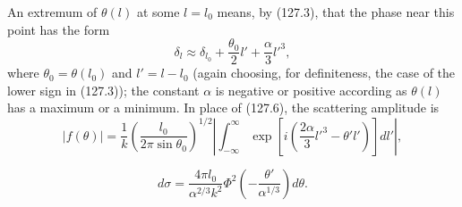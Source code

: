 

\SolutionHeading An extremum of $\theta(l)$ at some $l=l_0$ means, by (127.3), that the phase near this point has the form
\[
 \delta_l\approx\delta_{l_0}+\frac{\theta_0}{2}l'+\frac\alpha3l'^3,
\]
where $\theta_0=\theta(l_0)$ and $l'=l-l_0$ (again choosing, for definiteness, the case of the lower sign in (127.3)); the constant $\alpha$ is negative or positive according as $\theta(l)$ has a maximum or a minimum. In place of (127.6), the scattering amplitude is
\[
 |f(\theta)|=\frac1k\left(\frac{l_0}{2\pi\sin\theta_0}\right)^{1/2}
 \left|\int_{-\infty}^{\infty}\exp\left[i\left(\frac{2\alpha}3l'^3-\theta'l'\right)\right]dl'\right|,
\]

\[
 d\sigma=\frac{4\pi l_0}{\alpha^{2/3}k^2}
 \Phi^2\left(-\frac{\theta'}{\alpha^{1/3}}\right)d\theta.
\]
